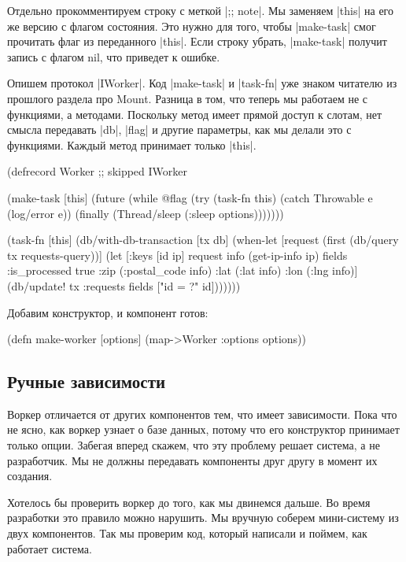 Отдельно прокомментируем строку с меткой \spverb|;; note|. Мы заменяем \spverb|this| на его же
версию с флагом состояния. Это нужно для того, чтобы \spverb|make-task| смог прочитать
флаг из переданного \spverb|this|. Если строку убрать, \spverb|make-task| получит запись с
флагом nil, что приведет к ошибке.

Опишем протокол \spverb|IWorker|. Код \spverb|make-task| и \spverb|task-fn| уже знаком читателю из
прошлого раздела про Mount. Разница в том, что теперь мы работаем не с
функциями, а методами. Поскольку метод имеет прямой доступ к слотам, нет смысла
передавать \spverb|db|, \spverb|flag| и другие параметры, как мы делали это с
функциями. Каждый метод принимает только \spverb|this|.

\begin{code}
(defrecord Worker
  ;; skipped
  IWorker

  (make-task [this]
    (future
      (while @flag
        (try (task-fn this)
             (catch Throwable e
               (log/error e))
             (finally
               (Thread/sleep (:sleep options)))))))

  (task-fn [this]
    (db/with-db-transaction [tx db]
      (when-let [request (first (db/query tx requests-query))]
        (let [{:keys [id ip]} request
              info (get-ip-info ip)
              fields {:is_processed true
                      :zip (:postal_code info)
                      :lat (:lat info)
                      :lon (:lng info)}]
          (db/update! tx :requests fields ["id = ?" id]))))))
\end{code}

Добавим конструктор, и компонент готов:

\begin{code}
(defn make-worker
  [options]
  (map->Worker {:options options}))
\end{code}

\subsection{Ручные зависимости}

Воркер отличается от других компонентов тем, что имеет зависимости. Пока что не
ясно, как воркер узнает о базе данных, потому что его конструктор принимает
только опции. Забегая вперед скажем, что эту проблему решает система, а не
разработчик. Мы не должны передавать компоненты друг другу в момент их создания.

Хотелось бы проверить воркер до того, как мы двинемся дальше. Во время
разработки это правило можно нарушить. Мы вручную соберем мини-систему из двух
компонентов. Так мы проверим код, который написали и поймем, как работает
система.

